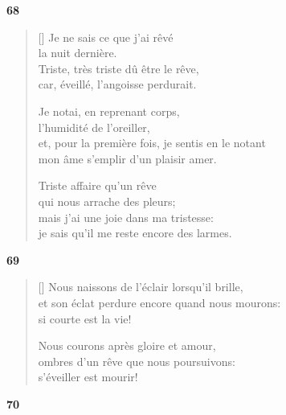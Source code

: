 \documentclass[a4paper,12pt]{book}
\begin{document}
\bigskip

\begin{center}
  \textbf{68}
\end{center}

\settowidth{\versewidth}{et, pour la première fois, je sentis en le notant}

\begin{verse}[\versewidth]
  Je ne sais ce que j'ai rêvé \\
  la nuit dernière. \\
  Triste, très triste dû être le rêve, \\
  car, éveillé, l'angoisse perdurait.

  Je notai, en reprenant corps, \\
  l'humidité de l'oreiller, \\
  et, pour la première fois, je sentis en le notant \\
  mon âme s'emplir d'un plaisir amer.

  Triste affaire qu'un rêve \\
  qui nous arrache des pleurs; \\
  mais j'ai une joie dans ma tristesse: \\
  je sais qu'il me reste encore des larmes.
\end{verse}

\bigskip

\begin{center}
  \textbf{69}
\end{center}

\settowidth{\versewidth}{et son éclat perdure encore quand nous mourons:}

\begin{verse}[\versewidth]
  Nous naissons de l'éclair lorsqu'il brille, \\
  et son éclat perdure encore quand nous mourons: \\
  si courte est la vie!

  Nous courons après gloire et amour, \\
  ombres d'un rêve que nous poursuivons: \\
  s'éveiller est mourir!
\end{verse}

\bigskip

\begin{center}
  \textbf{70}
\end{center}
\end{document}
